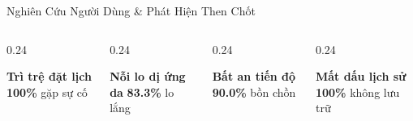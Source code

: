 \begin{frame}{Nghiên Cứu Người Dùng \& Phát Hiện Then Chốt}
  \vspace{1.5mm}
  \begin{columns}[c]
    \begin{column}{0.24\textwidth}
      \begin{block}{\centering \tiny \textbf{Trì trệ đặt lịch}}
        \centering \footnotesize \textbf{\color{PetcareAlert}100\%} \tiny gặp sự cố
      \end{block}
    \end{column}
    \begin{column}{0.24\textwidth}
      \begin{block}{\centering \tiny \textbf{Nỗi lo dị ứng da}}
        \centering \footnotesize \textbf{\color{PetcareAlert}83.3\%} \tiny lo lắng
      \end{block}
    \end{column}
    \begin{column}{0.24\textwidth}
      \begin{block}{\centering \tiny \textbf{Bất an tiến độ}}
        \centering \footnotesize \textbf{\color{PetcareAlert}90.0\%} \tiny bồn chồn
      \end{block}
    \end{column}
    \begin{column}{0.24\textwidth}
      \begin{block}{\centering \tiny \textbf{Mất dấu lịch sử}}
        \centering \footnotesize \textbf{\color{PetcareAlert}100\%} \tiny không lưu trữ
      \end{block}
    \end{column}
  \end{columns}
\end{frame}
